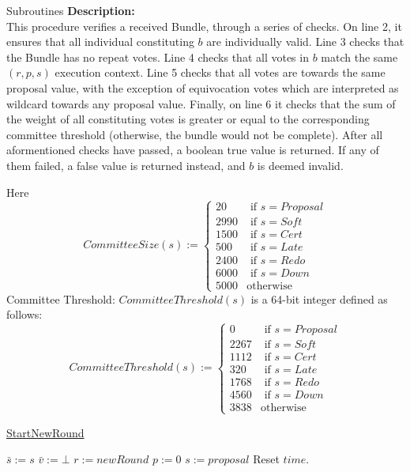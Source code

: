\documentclass[10pt,a4paper]{article}
\begin{document}
\begin{section}{Subroutines}
\noindent \textbf{Description:}\\
This procedure verifies a received Bundle, through a series 
of checks.
On line 2, it ensures that all individual constituting $b$
are individually valid.
Line 3 checks that the Bundle has no repeat votes.
Line 4 checks that all votes in $b$ match the same $(r,p,s)$
execution context.
Line 5 checks that all votes are towards the same proposal value,
with the exception of equivocation votes which are interpreted as wildcard
towards any proposal value.
Finally, on line 6 it checks that the sum of the weight of all constituting
votes is greater or equal to the corresponding committee threshold (otherwise, 
the bundle would not be complete).
After all aformentioned checks have passed, a boolean true value is returned.
If any of them failed, a false value is returned instead, and $b$ is deemed invalid.

Here
$$
CommitteeSize(s):= \left\{
\begin{array}{rl}
     20 & \text{ if }s = Proposal \\
   2990 & \text{ if }s = Soft \\
   1500 & \text{ if }s = Cert \\
    500 & \text{ if }s = Late \\
   2400 & \text{ if }s = Redo \\
   6000 & \text{ if }s = Down \\
   5000 & \text{otherwise}
\end{array}
\right.
$$
Committee Threshold: $CommitteeThreshold(s)$ is a 64-bit integer defined as follows:
$$
CommitteeThreshold(s):= \left\{
\begin{array}{rl}
     0 &  \text{ if }s = Proposal \\
  2267 &  \text{ if }s = Soft \\
  1112 &  \text{ if }s = Cert \\
   320 &  \text{ if }s = Late \\
  1768 &  \text{ if }s = Redo \\
  4560 &  \text{ if }s = Down \\
  3838 &  \text{otherwise}
\end{array}
\right.
$$


\begin{algorithm}[H]\label{algo:start-new-round}
    \caption{\underline{StartNewRound}}
    \label{algo:start-new-round}
    \begin{algorithmic}[1]
    \State $\bar{s} := s$
    \State $\bar{v} := \bot$
    \State $r := newRound$
    \State $p := 0$
    \State $s := proposal$
    \State Reset $time$.
    \EndFunction
    \end{algorithmic}
\end{algorithm}


\end{section}
\end{document}
